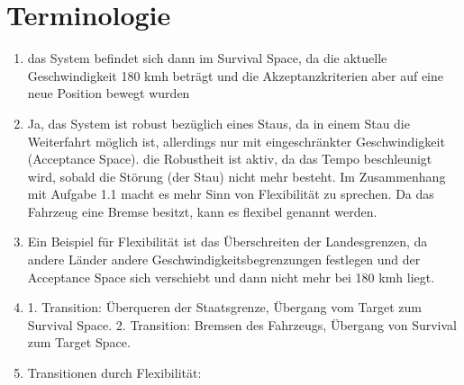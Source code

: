 \documentclass[
fontsize=12pt,          %
paper=a4,               %
captions=tableabove,    %
titlepage=firstiscover, %
BCOR=5mm,               %
toc=listof,             %
open=right,             %
]{scrreprt}
\begin{document}
\section{Terminologie}
\begin{enumerate}
	\item das System befindet sich dann im Survival Space, da die aktuelle Geschwindigkeit 180 kmh beträgt und die Akzeptanzkriterien aber auf eine neue Position bewegt wurden
	\item Ja, das System ist robust bezüglich eines Staus, da in einem Stau die Weiterfahrt möglich ist, allerdings nur mit eingeschränkter Geschwindigkeit (Acceptance Space). die Robustheit ist aktiv, da das Tempo beschleunigt wird, sobald die Störung (der Stau) nicht mehr besteht. Im Zusammenhang mit Aufgabe 1.1 macht es mehr Sinn von Flexibilität zu sprechen. Da das Fahrzeug eine Bremse besitzt, kann es flexibel genannt werden.
	\item Ein Beispiel für Flexibilität ist das Überschreiten der Landesgrenzen, da andere Länder andere Geschwindigkeitsbegrenzungen festlegen und der Acceptance Space sich verschiebt und dann nicht mehr bei 180 kmh liegt.
	\item 1. Transition: Überqueren der Staatsgrenze, Übergang vom Target zum Survival Space. 2. Transition: Bremsen des Fahrzeugs, Übergang von Survival zum Target Space.
	\item Transitionen durch Flexibilität:\newline\newline
\end{enumerate}
\end{document}
